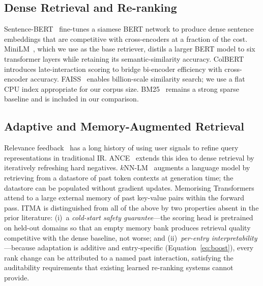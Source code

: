 \documentclass[journal]{IEEEtran}
\begin{document}
\subsection{Dense Retrieval and Re-ranking}
Sentence-BERT~\cite{reimers2019sbert} fine-tunes a siamese BERT network to
produce dense sentence embeddings that are competitive with cross-encoders
at a fraction of the cost.  MiniLM~\cite{wang2020minilm}, which we use as
the base retriever, distils a larger BERT model to six transformer layers
while retaining its semantic-similarity accuracy.
ColBERT~\cite{khattab2020colbert} introduces late-interaction scoring to
bridge bi-encoder efficiency with cross-encoder accuracy.
FAISS~\cite{johnson2021faiss} enables billion-scale similarity search; we
use a flat CPU index appropriate for our corpus size.
BM25~\cite{robertson2009bm25} remains a strong sparse baseline and is
included in our comparison.

\subsection{Adaptive and Memory-Augmented Retrieval}
Relevance feedback~\cite{rocchio1971relevance,lavrenko2001relevance} has a
long history of using user signals to refine query representations in
traditional IR.  ANCE~\cite{xiong2020ance} extends this idea to dense
retrieval by iteratively refreshing hard negatives.
$k$NN-LM~\cite{khandelwal2021knn} augments a language model by retrieving
from a datastore of past token contexts at generation time; the datastore
can be populated without gradient updates.  Memorising
Transformers~\cite{wu2022memorizing} attend to a large external memory of
past key-value pairs within the forward pass.  ITMA is distinguished from
all of the above by two properties absent in the prior literature: (i)~a
\emph{cold-start safety guarantee}---the scoring head is pretrained on
held-out domains so that an empty memory bank produces retrieval quality
competitive with the dense baseline, not worse; and (ii)~\emph{per-entry
interpretability}---because adaptation is additive and entry-specific
(Equation~\ref{eq:boost}), every rank change can be attributed to a named
past interaction, satisfying the auditability requirements that existing
learned re-ranking systems cannot provide.
\end{document}
